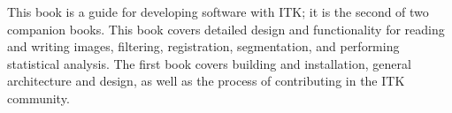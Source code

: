 This book is a guide for developing software with ITK; it is the second of two
companion books. This book covers detailed design and functionality for
reading and writing images, filtering, registration, segmentation, and
performing statistical analysis. The first book covers building and installation, general
architecture and design, as well as the process of contributing in the ITK
community.
